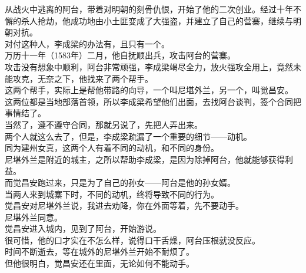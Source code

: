 \begin{multicols}{\theparacolNo}
从战火中逃离的阿台，带着对明朝的刻骨仇恨，开始了他的二次创业。经过十年不懈的杀人抢劫，他成功地由小土匪变成了大强盗，并建立了自己的营寨，继续与明朝对抗。\\

对付这种人，李成梁的办法有，且只有一个。\\

万历十一年（1583年）二月，他自抚顺出兵，攻击阿台的营寨。\\

攻击没有想象中顺利，阿台非常顽强，李成梁竭尽全力，放火强攻全用上，竟然未能攻克，无奈之下，他找来了两个帮手。\\

这两个帮手，实际上是帮他带路的向导，一个叫尼堪外兰，另一个，叫觉昌安。\\

这两位都是当地部落首领，所以李成梁希望他们出面，去找阿台谈判，签个合同把事情结了。\\

当然了，遵不遵守合同，那就另说了，先把人弄出来。\\

两个人就这么去了，但是，李成梁疏漏了一个重要的细节——动机。\\

同为建州女真，这两个人有着不同的动机，和不同的身份。\\

尼堪外兰是附近的城主，之所以帮助李成梁，是因为除掉阿台，他就能够获得利益。\\

而觉昌安跑过来，只是为了自己的孙女——阿台是他的孙女婿。\\

当两人来到城寨下时，不同的动机，终将导致不同的行为。\\

觉昌安对尼堪外兰说，我进去劝降，你在外面等着，先不要动手。\\

尼堪外兰同意。\\

觉昌安进入城内，见到了阿台，开始游说。\\

很可惜，他的口才实在不怎么样，说得口干舌燥，阿台压根就没反应。\\

时间不断逝去，等在城外的尼堪外兰开始不耐烦了。\\

但他很明白，觉昌安还在里面，无论如何不能动手。\\


\end{multicols}
